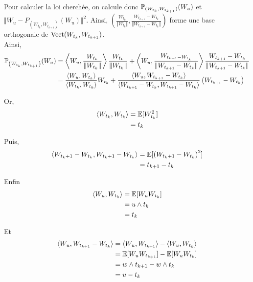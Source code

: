 Pour calculer la loi cherchée, on calcule donc $\P_{(W_{t_k}, W_{t_{k+1}})}(W_u)$ et $ \Vert W_u - P_{(W_{t_k}, W_{t_{k+1}})}(W_u) \Vert^2$.
Ainsi, $\left( \frac{W_{t_k}}{\Vert W_{t_k}\Vert}, \frac{ W_{t_{k+1}}-W_{t_k} }{\Vert W_{t_{k+1}}-W_{t_k} \Vert }\right)$ forme une base orthogonale de $\Vect(W_{t_k}, W_{t_{k+1}})$. \\

Ainsi,
\begin{equation*}
\begin{split}
  \P_{\left( W_{t_k}, W_{t_{k+1}} \right)} (W_u) &= \left\langle W_u, \frac{W_{t_k}}{\Vert W_{t_k} \Vert} \right\rangle \frac{W_{t_k}}{\Vert W_{t_k} \Vert} + \left\langle W_u, \frac{W_{t_{k+1} - W_{t_k}}}{\Vert W_{t_{k+1}} - W_{t_k} \Vert} \right\rangle \frac{W_{t_{k+1}} - W_{t_k}}{\Vert W_{t_{k+1}} - W_{t_k} \Vert} \\
  &= \frac{ \langle W_u, W_{t_k} \rangle}{ \langle W_{t_k}, W_{t_k} \rangle} W_{t_k} + \frac{ \langle W_u, W_{t_{k+1}} - W_{t_k} \rangle}{ \langle W_{t_{k+1}} - W_{t_k},W_{t_{k+1}} - W_{t_k}  \rangle} \left(W_{t_{k+1}} - W_{t_k}\right)
\end{split}
\end{equation*}

Or, 
\newcommand{\wtk}{W_{t_k}}
\newcommand{\wu}{W_{u}}
\newcommand{\wtkp}{W_{t_k+1}}
\begin{equation*}
\begin{split}
  \langle \wtk, \wtk \rangle &= \E[\wtk^2] \\
  &= t_k
\end{split}
\end{equation*}

Puis,
\begin{equation*}
\begin{split}
  \langle \wtkp - \wtk, \wtkp - \wtk \rangle &= \E[\left( \wtkp - \wtk \right)^2] \\
  &= t_{k+1} - t_k
\end{split}
\end{equation*}

Enfin
\begin{equation*}
\begin{split}
  \langle \wu , \wtk \rangle &= \E[\wu \wtk] \\
  &= u \wedge t_k \\
  &= t_k
\end{split}
\end{equation*}

Et 
\begin{equation*}
\begin{split}
  \langle \wu, W_{t_{k+1}} - W_{t_k} \rangle &= \langle \wu, W_{t_{k+1}} \rangle - \langle W_u, W_{t_k} \rangle \\
  &= \E[W_u W_{t_{k+1}}] - \E[W_u W_{t_k}] \\
  &= w \wedge t_{k+1} - w \wedge t_k \\
  &= u - t_k
\end{split}
\end{equation*}

